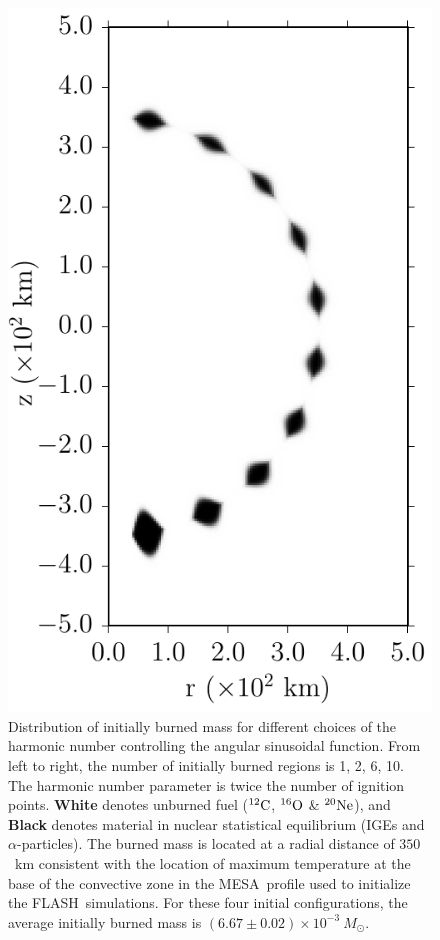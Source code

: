\documentclass[iop,apj]{emulateapj}
\newcommand{\C}[1]{\ensuremath{{}^{#1}{\rm C}}}
\newcommand{\Ox}[1]{\ensuremath{{}^{#1}{\rm O}}}
\newcommand{\Ne}[1]{\ensuremath{{}^{#1}{\rm Ne}}}
\newcommand{\code}[1]{\textsc{#1}}
\newcommand{\FLASH}{\code{FLASH}}
\newcommand{\MESA}{\code{MESA}}
\newcommand{\Msun}{\ensuremath{M_\odot}}
\begin{document}
\begin{figure}[ht]
\begin{minipage}{0.24\textwidth}
    \includegraphics[width=\linewidth]{figures/cf_initcond_rhoddt-7.2/profile75_mpole-20_r-35e6_a-24e5_init.pdf}
  \end{minipage} \caption{\label{fig:init_mpole_comparison}
    Distribution of initially burned mass for different choices of the
    harmonic number controlling the angular sinusoidal function. From
    left to right, the number of initially burned regions is 1, 2, 6,
    10. The harmonic number parameter is twice the number of ignition
    points. \textbf{White} denotes unburned fuel (\C{12}, \Ox{16} \&
    \Ne{20}), and \textbf{Black} denotes material in nuclear
    statistical equilibrium (IGEs and $\alpha$-particles). The burned
    mass is located at a radial distance of $350$~km consistent with
    the location of maximum temperature at the base of the convective
    zone in the \MESA\ profile used to initialize the
    \FLASH\ simulations. For these four initial configurations, the
    average initially burned mass is $(6.67 \pm 0.02) \times
    10^{-3}\ \Msun$.}
\end{figure}
\end{document}
